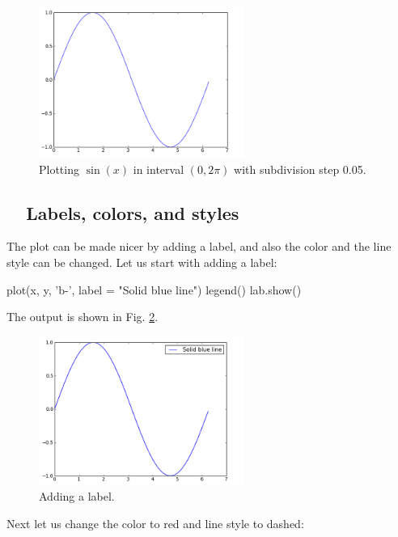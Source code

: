 \begin{figure}[!ht]
\begin{center}
\includegraphics[width=0.6\textwidth]{imgp/plot1.png}
\end{center}
\vspace{-6mm}
\caption{Plotting $\sin(x)$ in interval $(0, 2\pi)$ with subdivision step 0.05.}
\label{fig:plot1}
\vspace{-2mm}
\end{figure}
\noindent

\subsection{\ \ Labels, colors, and styles}

The plot can be made nicer by adding a label, and also the color 
and the line style can be changed. Let us start with adding a label:

\begin{bluecode}
plot(x, y, 'b-', label = "Solid blue line")
legend()
lab.show()
\end{bluecode}
The output is shown in Fig. \ref{fig:plot2}.\\[-7mm]

\begin{figure}[!ht]
\begin{center}
\includegraphics[width=0.6\textwidth]{imgp/plot2.png}
\end{center}
\vspace{-6mm}
\caption{Adding a label.}
\label{fig:plot2}
\end{figure}
\newpage
\noindent
Next let us change the color to red and line style to dashed: 

